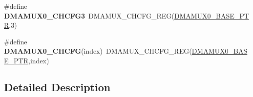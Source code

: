 \begin{DoxyCompactItemize}
\#define {\bfseries D\+M\+A\+M\+U\+X0\+\_\+\+C\+H\+C\+F\+G3}~D\+M\+A\+M\+U\+X\+\_\+\+C\+H\+C\+F\+G\+\_\+\+R\+EG(\hyperlink{group___d_m_a_m_u_x___peripheral_ga403b61d306820e4e1113c636300004a3}{D\+M\+A\+M\+U\+X0\+\_\+\+B\+A\+S\+E\+\_\+\+P\+TR},3)
\item 
\mbox{\label{group___d_m_a_m_u_x___register___accessor___macros_ga85c63a44a623413d6615ecf2e1957fd8}} 
\#define {\bfseries D\+M\+A\+M\+U\+X0\+\_\+\+C\+H\+C\+FG}(index)~D\+M\+A\+M\+U\+X\+\_\+\+C\+H\+C\+F\+G\+\_\+\+R\+EG(\hyperlink{group___d_m_a_m_u_x___peripheral_ga403b61d306820e4e1113c636300004a3}{D\+M\+A\+M\+U\+X0\+\_\+\+B\+A\+S\+E\+\_\+\+P\+TR},index)
\end{DoxyCompactItemize}


\subsection{Detailed Description}
